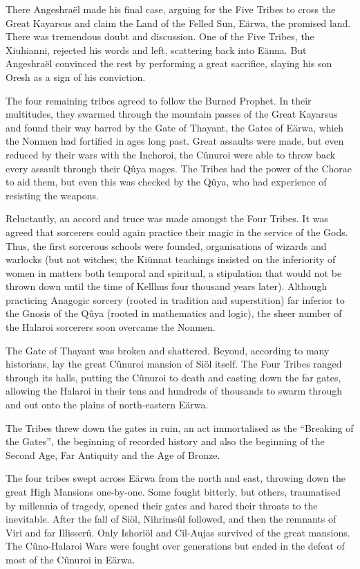 \documentclass[]{book}
\begin{document}
There Angeshraël made his final case, arguing for the Five Tribes to cross the Great
Kayarsus and claim the Land of the Felled Sun, Eärwa, the promised land. There was
tremendous doubt and discussion. One of the Five Tribes, the Xiuhianni, rejected his
words and left, scattering back into Eänna. But Angeshraël convinced the rest by
performing a great sacrifice, slaying his son Oresh as a sign of his conviction.

The four remaining tribes agreed to follow the Burned Prophet. In their multitudes,
they swarmed through the mountain passes of the Great Kayarsus and found their way
barred by the Gate of Thayant, the Gates of Eärwa, which the Nonmen had fortified in
ages long past. Great assaults were made, but even reduced by their wars with the
Inchoroi, the Cûnuroi were able to throw back every assault through their Qûya mages.
The Tribes had the power of the Chorae to aid them, but even this was checked by the
Qûya, who had experience of resisting the weapons.

Reluctantly, an accord and truce was made amongst the Four Tribes. It was agreed that
sorcerers could again practice their magic in the service of the Gods. Thus, the first
sorcerous schools were founded, organisations of wizards and warlocks (but not
witches; the Kiünnat teachings insisted on the inferiority of women in matters both
temporal and spiritual, a stipulation that would not be thrown down until the time of
Kellhus four thousand years later). Although practicing Anagogic sorcery (rooted in
tradition and superstition) far inferior to the Gnosis of the Qûya (rooted in
mathematics and logic), the sheer number of the Halaroi sorcerers soon overcame the
Nonmen.

The Gate of Thayant was broken and shattered. Beyond, according to many historians,
lay the great Cûnuroi mansion of Siöl itself. The Four Tribes ranged through its halls,
putting the Cûnuroi to death and casting down the far gates, allowing the Halaroi in
their tens and hundreds of thousands to swarm through and out onto the plains of
north-eastern Eärwa.

The Tribes threw down the gates in ruin, an act immortalised as the ``Breaking of the
Gates'', the beginning of recorded history and also the beginning of the Second Age,
Far Antiquity and the Age of Bronze.

The four tribes swept across Eärwa from the north and east, throwing down the great
High Mansions one-by-one. Some fought bitterly, but others, traumatised by millennia
of tragedy, opened their gates and bared their throats to the inevitable. After the fall of
Siöl, Nihrimsûl followed, and then the remnants of Viri and far Illisserû. Only Ishoriöl
and Cil-Aujas survived of the great mansions. The Cûno-Halaroi Wars were fought over
generations but ended in the defeat of most of the Cûnuroi in Eärwa.
\end{document}
